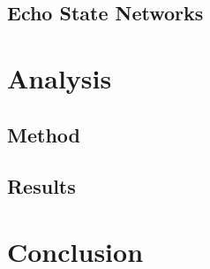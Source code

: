 \documentclass{article}
\begin{document}
\subsection{Echo State Networks}

\section{Analysis}

\subsection{Method}
\subsection{Results}

\section{Conclusion}



\end{document}

